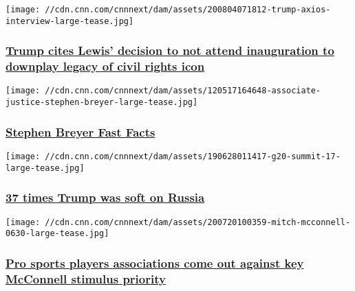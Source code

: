 \href{/2020/08/04/politics/trump-john-lewis-axios/index.html}{}

\texttt{[image: //cdn.cnn.com/cnnnext/dam/assets/200804071812-trump-axios-interview-large-tease.jpg]}

\hypertarget{trump-cites-lewis-decision-to-not-attend-inauguration-to-downplay-legacy-of-civil-rights-icon}{%
\subsubsection{\texorpdfstring{\href{/2020/08/04/politics/trump-john-lewis-axios/index.html}{Trump
cites Lewis' decision to not attend inauguration to downplay legacy of
civil rights
icon}}{Trump cites Lewis' decision to not attend inauguration to downplay legacy of civil rights icon}}\label{trump-cites-lewis-decision-to-not-attend-inauguration-to-downplay-legacy-of-civil-rights-icon}}

\href{/2013/02/19/us/stephen-breyer-fast-facts/index.html}{}

\texttt{[image: //cdn.cnn.com/cnnnext/dam/assets/120517164648-associate-justice-stephen-breyer-large-tease.jpg]}

\hypertarget{stephen-breyer-fast-facts}{%
\subsubsection{\texorpdfstring{\href{/2013/02/19/us/stephen-breyer-fast-facts/index.html}{Stephen
Breyer Fast
Facts}}{Stephen Breyer Fast Facts}}\label{stephen-breyer-fast-facts}}

\href{/2019/11/17/politics/trump-soft-on-russia/index.html}{}

\texttt{[image: //cdn.cnn.com/cnnnext/dam/assets/190628011417-g20-summit-17-large-tease.jpg]}

\hypertarget{37-times-trump-was-soft-on-russia}{%
\subsubsection{\texorpdfstring{\href{/2019/11/17/politics/trump-soft-on-russia/index.html}{37
times Trump was soft on
Russia}}{37 times Trump was soft on Russia}}\label{37-times-trump-was-soft-on-russia}}

\href{/2020/08/03/politics/pro-sports-associations-against-gop-stimulus/index.html}{}

\texttt{[image: //cdn.cnn.com/cnnnext/dam/assets/200720100359-mitch-mcconnell-0630-large-tease.jpg]}

\hypertarget{pro-sports-players-associations-come-out-against-key-mcconnell-stimulus-priority-}{%
\subsubsection{\texorpdfstring{\href{/2020/08/03/politics/pro-sports-associations-against-gop-stimulus/index.html}{Pro
sports players associations come out against key McConnell stimulus
priority
}}{Pro sports players associations come out against key McConnell stimulus priority }}\label{pro-sports-players-associations-come-out-against-key-mcconnell-stimulus-priority-}}

